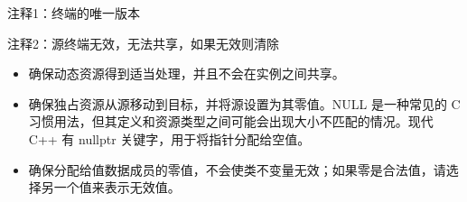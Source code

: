 {\footnotesize
注释1：终端的唯一版本

注释2：源终端无效，无法共享，如果无效则清除
}


\begin{itemize}
\item
确保动态资源得到适当处理，并且不会在实例之间共享。

\item
确保独占资源从源移动到目标，并将源设置为其零值。NULL 是一种常见的 C 习惯用法，但其定义和资源类型之间可能会出现大小不匹配的情况。现代 C++ 有 nullptr 关键字，用于将指针分配给空值。

\item
确保分配给值数据成员的零值，不会使类不变量无效；如果零是合法值，请选择另一个值来表示无效值。
\end{itemize}


















